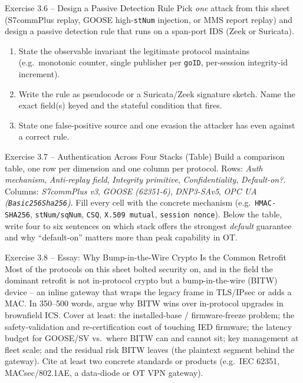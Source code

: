 \documentclass[11pt,a4paper]{article}
\begin{document}
\begin{taskbox}{Exercise 3.6 -- Design a Passive Detection Rule}
Pick \emph{one} attack from this sheet (S7commPlus replay, GOOSE
high-\texttt{stNum} injection, or MMS report replay) and design a passive
detection rule that runs on a span-port IDS (Zeek or Suricata).
\begin{enumerate}
  \item State the observable invariant the legitimate protocol maintains
        (e.g.\ monotonic counter, single publisher per \texttt{goID},
        per-session integrity-id increment).
  \item Write the rule as pseudocode or a Suricata/Zeek signature sketch.
        Name the exact field(s) keyed and the stateful condition that fires.
  \item State one false-positive source and one evasion the attacker has
        even against a correct rule.
\end{enumerate}
\end{taskbox}

\begin{taskbox}{Exercise 3.7 -- Authentication Across Four Stacks (Table)}
Build a comparison table, one row per dimension and one column per protocol.
Rows: \emph{Auth mechanism}, \emph{Anti-replay field}, \emph{Integrity
primitive}, \emph{Confidentiality}, \emph{Default-on?}. Columns:
\emph{S7commPlus v3}, \emph{GOOSE (62351-6)}, \emph{DNP3-SAv5},
\emph{OPC UA (\texttt{Basic256Sha256})}. Fill every cell with the concrete
mechanism (e.g.\ \texttt{HMAC-SHA256}, \texttt{stNum/sqNum}, \texttt{CSQ},
\texttt{X.509 mutual}, \texttt{session nonce}). Below the table, write four
to six sentences on which stack offers the strongest \emph{default}
guarantee and why ``default-on'' matters more than peak capability in OT.
\end{taskbox}

\begin{taskbox}{Exercise 3.8 -- Essay: Why Bump-in-the-Wire Crypto Is the Common Retrofit}
Most of the protocols on this sheet bolted security on, and in the field the
dominant retrofit is not in-protocol crypto but a bump-in-the-wire (BITW)
device -- an inline gateway that wraps the legacy frame in TLS/IPsec or
adds a MAC. In 350--500 words, argue why BITW wins over in-protocol upgrades
in brownfield ICS. Cover at least: the installed-base / firmware-freeze
problem; the safety-validation and re-certification cost of touching IED
firmware; the latency budget for GOOSE/SV vs.\ where BITW can and cannot
sit; key management at fleet scale; and the residual risk BITW leaves
(the plaintext segment behind the gateway). Cite at least two concrete
standards or products (e.g.\ IEC 62351, MACsec/802.1AE, a data-diode or OT
VPN gateway).
\end{taskbox}
\end{document}
